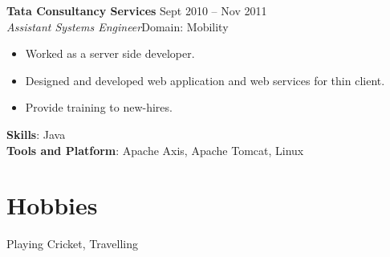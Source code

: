 \documentclass[margin,line]{res}
\begin{document}
\begin{resume}

{\bf Tata Consultancy Services}   \hfill{Sept 2010 -- Nov 2011}\\
{\em Assistant Systems Engineer}\hfill {Domain: Mobility}\\

\begin{itemize}      %
   \setlength\itemsep{-1em}

\item Worked as a server side developer.\\ 
\item Designed and developed web application and web services for thin client.\\
\item Provide training to new-hires.

\end{itemize}

{\bf Skills}: Java \\
{\bf Tools and Platform}: Apache Axis, Apache Tomcat, Linux\\



\section{\sc Hobbies }
 Playing Cricket, Travelling


\end{resume}
\end{document}
